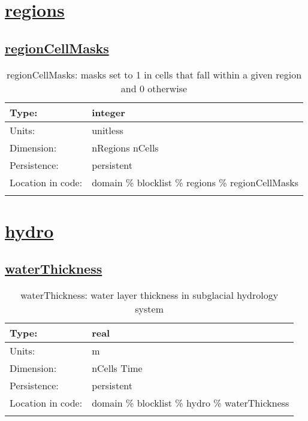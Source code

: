 \section[regions]{\hyperref[sec:var_tab_regions]{regions}}
\label{sec:var_sec_regions}
\subsection[regionCellMasks]{\hyperref[sec:var_tab_regions]{regionCellMasks}}
\label{subsec:var_sec_regions_regionCellMasks}
\begin{center}
\begin{longtable}{| p{2.0in} | p{4.0in} |}
        \hline 
        Type: & integer \\
        \hline 
        Units: & \si{unitless} \\
        \hline 
        Dimension: & nRegions nCells \\
        \hline 
        Persistence: & persistent \\
        \hline 
         Location in code: & domain \% blocklist \% regions \% regionCellMasks \\
         \hline 
    \caption{regionCellMasks: masks set to 1 in cells that fall within a given region and 0 otherwise}
\end{longtable}
\end{center}
\section[hydro]{\hyperref[sec:var_tab_hydro]{hydro}}
\label{sec:var_sec_hydro}
\subsection[waterThickness]{\hyperref[sec:var_tab_hydro]{waterThickness}}
\label{subsec:var_sec_hydro_waterThickness}
\begin{center}
\begin{longtable}{| p{2.0in} | p{4.0in} |}
        \hline 
        Type: & real \\
        \hline 
        Units: & \si{m} \\
        \hline 
        Dimension: & nCells Time \\
        \hline 
        Persistence: & persistent \\
        \hline 
         Location in code: & domain \% blocklist \% hydro \% waterThickness \\
         \hline 
    \caption{waterThickness: water layer thickness in subglacial hydrology system}
\end{longtable}
\end{center}
